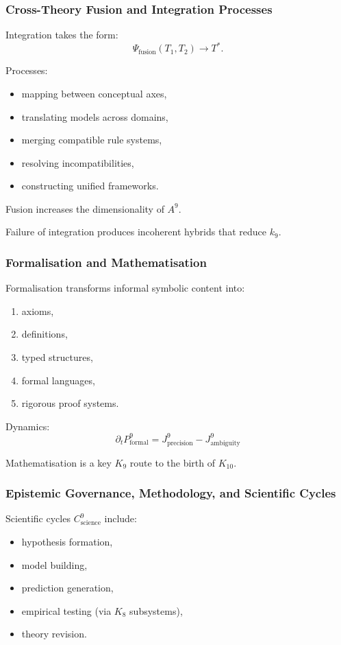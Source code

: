 \subsubsection{Cross-Theory Fusion and Integration Processes}

Integration takes the form:
\[
\Psi_{\text{fusion}}(T_1, T_2) \to T^{*}.
\]

Processes:
\begin{itemize}
    \item mapping between conceptual axes,
    \item translating models across domains,
    \item merging compatible rule systems,
    \item resolving incompatibilities,
    \item constructing unified frameworks.
\end{itemize}

Fusion increases the dimensionality of $A^9$.

Failure of integration produces incoherent hybrids
that reduce $k_9$.

\subsubsection{Formalisation and Mathematisation}

Formalisation transforms informal symbolic content into:
\begin{enumerate}
    \item axioms,
    \item definitions,
    \item typed structures,
    \item formal languages,
    \item rigorous proof systems.
\end{enumerate}

Dynamics:
\[
\partial_t P^9_{\text{formal}}
= J^9_{\text{precision}} - J^9_{\text{ambiguity}}
\]

Mathematisation is a key $K_9$ route to the birth of $K_{10}$.

\subsubsection{Epistemic Governance, Methodology, and Scientific Cycles}

Scientific cycles $C^9_{\text{science}}$ include:
\begin{itemize}
    \item hypothesis formation,
    \item model building,
    \item prediction generation,
    \item empirical testing (via $K_8$ subsystems),
    \item theory revision.
\end{itemize}

